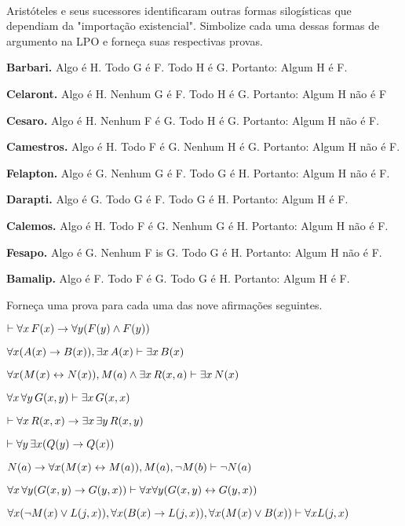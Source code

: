 \
 
\problempart
\label{pr.BarbaraEtc.proof2}
Arist\'oteles e seus sucessores identificaram outras formas silog\'isticas que dependiam da "importa\c c\~ao existencial". Simbolize cada uma dessas formas de argumento na LPO e  forne\c ca suas respectivas  provas.
\begin{earg}
	\item \textbf{Barbari.} Algo \'e H. Todo G \'e F. Todo H \'e G. Portanto: Algum H \'e F.
	\item \textbf{Celaront.} Algo \'e H. Nenhum G \'e F. Todo H \'e G. Portanto: Algum H n\~ao \'e F
	\item \textbf{Cesaro.} Algo \'e H. Nenhum F \'e G. Todo H \'e G. Portanto: Algum H n\~ao \'e  F.
	\item \textbf{Camestros.} Algo \'e H. Todo F \'e G. Nenhum H \'e G. Portanto: Algum H n\~ao \'e F.
	\item \textbf{Felapton.} Algo \'e G. Nenhum G \'e F. Todo G \'e H. Portanto: Algum H n\~ao \'e F.
	\item \textbf{Darapti.} Algo \'e G. Todo G \'e F. Todo G \'e H. Portanto: Algum H \'e F.
	\item \textbf{Calemos.} Algo \'e H. Todo F \'e G. Nenhum G \'e H. Portanto: Algum H n\~ao \'e F.
	\item \textbf{Fesapo.} Algo \'e G. Nenhum F is G. Todo G \'e H. Portanto: Algum H n\~ao \'e F.
	\item \textbf{Bamalip.} Algo \'e F. Todo F \'e G. Todo G \'e H. Portanto: Algum H \'e F.
\end{earg}

\problempart
\label{pr.someFOLproofs}
Forne\c ca uma prova para cada uma das nove afirma\c c\~oes seguintes. 
\begin{earg}
\item $\vdash \forall x\,\mathord{F}(x) \rightarrow \forall y(\mathord{F}(y) \wedge \mathord{F}(y))$
\item $\forall x(\mathord{A}(x)\rightarrow \mathord{B}(x)), \exists x\,\mathord{A}(x) \vdash \exists x\,\mathord{B}(x)$
\item $\forall x(\mathord{M}(x) \leftrightarrow \mathord{N}(x)), \mathord{M}(a) \wedge \exists x\,\mathord{R}(x,a) \vdash \exists x\,\mathord{N}(x)$
\item $\forall x\, \forall y\,\mathord{G}(x,y)\vdash\exists x\,\mathord{G}(x,x)$
\item $\vdash\forall x\,\mathord{R}(x,x) \rightarrow \exists x\, \exists y\,\mathord{R}(x,y)$
\item $\vdash\forall y\, \exists x (\mathord{Q}(y) \rightarrow \mathord{Q}(x))$
\item $\mathord{N}(a) \rightarrow \forall x(\mathord{M}(x) \leftrightarrow \mathord{M}(a)), \mathord{M}(a), \neg\mathord{M}(b)\vdash \neg \mathord{N}(a)$
\item $\forall x\, \forall y (\mathord{G}(x,y) \rightarrow \mathord{G}(y,x)) \vdash \forall x\forall y (\mathord{G}(x,y) \leftrightarrow \mathord{G}(y,x))$
\item $\forall x(\neg\mathord{M}(x) \vee \mathord{L}(j,x)), \forall x(\mathord{B}(x)\rightarrow \mathord{L}(j,x)), \forall x(\mathord{M}(x)\vee \mathord{B}(x))\vdash \forall x\mathord{L}(j,x)$
\end{earg}
 
